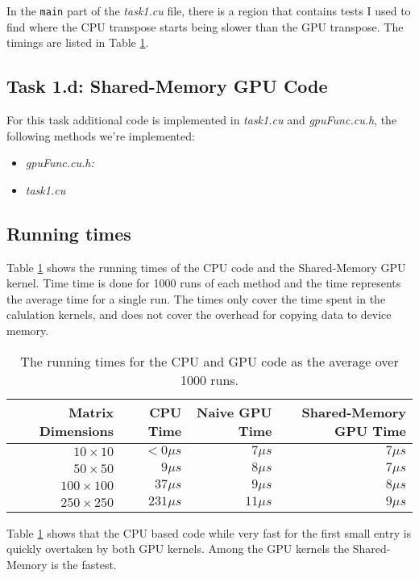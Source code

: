 In the \texttt{main} part of the \textit{task1.cu} file, there is a region that
contains tests I used to find where the CPU transpose starts being slower than
the GPU transpose. The timings are listed in Table \ref{tab:task1time}.


\subsection{Task 1.d: Shared-Memory GPU Code}
For this task additional code is implemented in \textit{task1.cu} and
\textit{gpuFunc.cu.h}, the following methods we're implemented:
\begin{itemize}
    \item \textit{gpuFunc.cu.h:}

    \item \textit{task1.cu}
\end{itemize}

\subsection{Running times}

Table \ref{tab:task1time} shows the running times of the CPU code and the
Shared-Memory GPU kernel. Time time is done for 1000 runs of each method and the
time represents the average time for a single run. The times only cover the time
spent in the calulation kernels, and does not cover the overhead for copying
data to device memory.

\begin{table}
    \begin{tabular}{|r|r|r|r|}
        \hline
        \textbf{Matrix Dimensions} & \textbf{CPU Time} & \textbf{Naive GPU Time} & \textbf{Shared-Memory GPU Time}\\\hline
        $10 \times  10$ & $ <0\mu s$ & $ 7\mu s$ & $7\mu s$ \\
        $50 \times  50$ & $  9\mu s$ & $ 8\mu s$ & $7\mu s$ \\
        $100\times 100$ & $ 37\mu s$ & $ 9\mu s$ & $8\mu s$ \\
        $250\times 250$ & $231\mu s$ & $11\mu s$ & $9\mu s$ \\\hline

    \end{tabular}
    \caption{The running times for the CPU and GPU code as the average over 1000
    runs.}
    \label{tab:task1time}
\end{table}

Table \ref{tab:task1time} shows that the CPU based code while very fast for the
first small entry is quickly overtaken by both GPU kernels. Among the GPU
kernels the Shared-Memory is the fastest.
